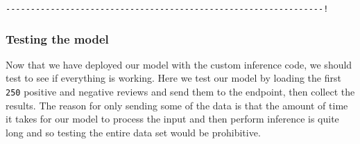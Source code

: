\documentclass[11pt]{article}
\begin{document}
    \begin{Verbatim}[commandchars=\\\{\}]
----------------------------------------------------------------!
    \end{Verbatim}

    \hypertarget{testing-the-model}{%
\subsubsection{Testing the model}\label{testing-the-model}}

Now that we have deployed our model with the custom inference code, we
should test to see if everything is working. Here we test our model by
loading the first \texttt{250} positive and negative reviews and send
them to the endpoint, then collect the results. The reason for only
sending some of the data is that the amount of time it takes for our
model to process the input and then perform inference is quite long and
so testing the entire data set would be prohibitive.
\end{document}
